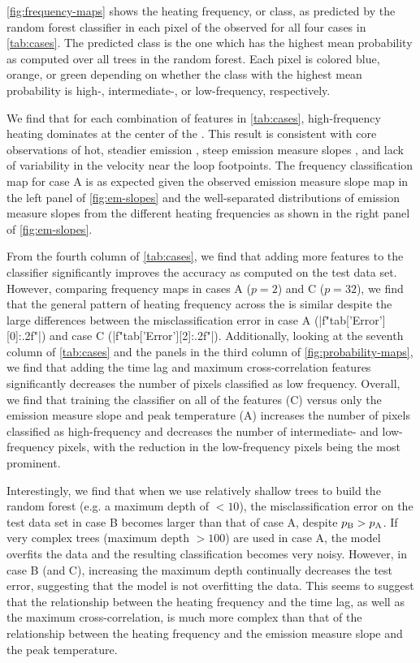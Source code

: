 \autoref{fig:frequency-maps} shows the heating frequency, or class, as predicted by the random forest classifier in each pixel of the observed \AR{} for all four cases in \autoref{tab:cases}.
The predicted class is the one which has the highest mean probability as computed over all trees in the random forest.
Each pixel is colored blue, orange, or green depending on whether the class with the highest mean probability is high-, intermediate-, or low-frequency, respectively.

We find that for each combination of features in \autoref{tab:cases}, high-frequency heating dominates at the center of the \AR{}.
This result is consistent with \AR{} core observations of hot, steadier emission \citep{warren_evidence_2010,warren_constraints_2011}, steep emission measure slopes \citep[e.g.][]{winebarger_using_2011,del_zanna_evolution_2015}, and lack of variability in the velocity \citep{brooks_flows_2009} near the loop footpoints.
The frequency classification map for case A is as expected given the observed emission measure slope map in the left panel of \autoref{fig:em-slopes} and the well-separated distributions of emission measure slopes from the different heating frequencies as shown in the right panel of \autoref{fig:em-slopes}.

From the fourth column of \autoref{tab:cases}, we find that adding more features to the classifier significantly improves the accuracy as computed on the test data set.
However, comparing frequency maps in cases A ($p=2$) and C ($p=32$), we find that the general pattern of heating frequency across the \AR{} is similar despite the large differences between the misclassification error in case A (\py[manager_ml]|f"{tab['Error'][0]:.2f}"|) and case C (\py[manager_ml]|f"{tab['Error'][2]:.2f}"|).
Additionally, looking at the seventh column of \autoref{tab:cases} and the panels in the third column of \autoref{fig:probability-maps}, we find that adding the time lag and maximum cross-correlation features significantly decreases the number of pixels classified as low frequency.
Overall, we find that training the classifier on all of the features (C) versus only the emission measure slope and peak temperature (A) increases the number of pixels classified as high-frequency and decreases the number of intermediate- and low-frequency pixels, with the reduction in the low-frequency pixels being the most prominent.

Interestingly, we find that when we use relatively shallow trees to build the random forest (e.g. a maximum depth of $<10$), the misclassification error on the test data set in case B becomes larger than that of case A, despite $p_\textup{B}>p_\textup{A}$.
If very complex trees (maximum depth $>100$) are used in case A, the model overfits the data and the resulting classification becomes very noisy. 
However, in case B (and C), increasing the maximum depth continually decreases the test error, suggesting that the model is not overfitting the data. 
This seems to suggest that the relationship between the heating frequency and the time lag, as well as the maximum cross-correlation, is much more complex than that of the relationship between the heating frequency and the emission measure slope and the peak temperature.

